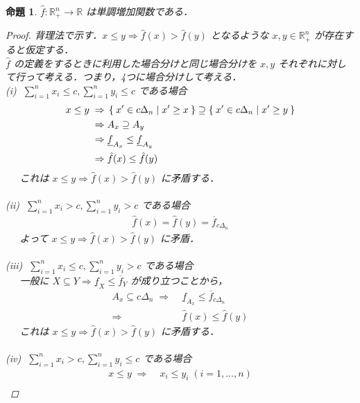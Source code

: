 \documentclass[a4paper,11pt]{jreport}
\newtheorem{proposition}{命題}
\begin{document}
\begin{proposition}
$ \hat{f} : \mathbb{R}_+^n \to \mathbb{R} $ は単調増加関数である．

\begin{proof}
背理法で示す．$ x \leq y \Rightarrow \hat{f}(x) > \hat{f}(y) $ となるような $ x, y \in \mathbb{R}_+^n $ が存在すると仮定する．\\
$ \hat{f} $ の定義をするときに利用した場合分けと同じ場合分けを $ x, y $ それぞれに対して行って考える．つまり，4つに場合分けして考える．\\
(i) $ \; \sum_{i = 1}^{n} x_i \leq c, \sum_{i = 1}^{n} y_i \leq c $ である場合
\begin{align*}
x \leq y \; \Rightarrow & \; \Set{x' \in c \Delta_n | x' \geq x} \supseteq \Set{x' \in c \Delta_n | x' \geq y} \\
\Rightarrow & \; A_x \supseteq A_y \\
\Rightarrow & \; \underline{f}_{A_x} \leq \underline{f}_{A_y} \\
\Rightarrow & \; \hat{f}(x) \leq \hat{f}(y)
\end{align*}
$ \;\;\;\; $ これは $ x \leq y \Rightarrow \hat{f}(x) > \hat{f}(y) $ に矛盾する．\\
\\
(ii) $ \; \sum_{i = 1}^{n} x_i > c, \sum_{i = 1}^{n} y_i > c $ である場合
\begin{align*}
\hat{f}(x) = \hat{f}(y) = \overline{f}_{c \Delta_n}
\end{align*}
$ \;\;\;\; $ よって $ x \leq y \Rightarrow \hat{f}(x) > \hat{f}(y) $ に矛盾．\\
\\
(iii) $ \; \sum_{i = 1}^{n} x_i \leq c, \sum_{i = 1}^{n} y_i > c $ である場合 \\
$ \;\;\;\; $ 一般に $ X \subseteq Y \Rightarrow \underline{f}_X \leq \overline{f}_Y $ が成り立つことから， 
\begin{align*}
A_x \subseteq c \Delta_n \; \Rightarrow & \; \underline{f}_{A_x} \leq \overline{f}_{c \Delta_n} \\
\Rightarrow & \; \hat{f}(x) \leq \hat{f}(y)
\end{align*}
$ \;\;\;\; $ これは $ x \leq y \Rightarrow \hat{f}(x) > \hat{f}(y) $ に矛盾する．\\
\\
(iv) $ \; \sum_{i = 1}^{n} x_i > c, \sum_{i = 1}^{n} y_i \leq c $ である場合
\begin{align*}
x \leq y \; \Rightarrow & \; x_i \leq y_i \; (i = 1, ..., n) \\

\end{align*}
\end{proof}
\end{proposition}
\end{document}
